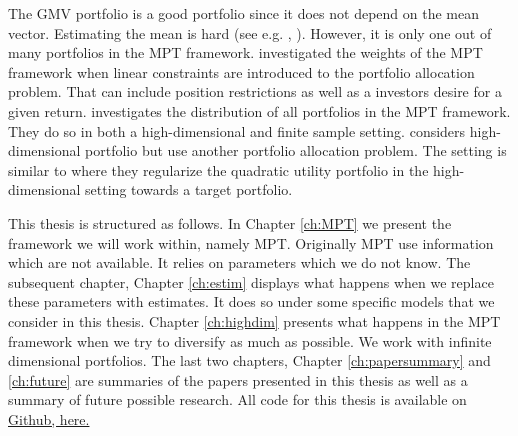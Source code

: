 The GMV portfolio is a good portfolio since it does not depend on the mean vector.
Estimating the mean is hard (see e.g. \citet{merton1980estimating}, \citet{best1991sensitivity}).
However, it is only one out of many portfolios in the MPT framework.
\citet{el2010high} investigated the weights of the MPT framework when linear constraints are introduced to the portfolio allocation problem.
That can include position restrictions as well as a investors desire for a given return.
\citet{bodnar2020sampling} investigates the distribution of all portfolios in the MPT framework.
They do so in both a high-dimensional and finite sample setting.
\citet{bodnarokhrinparolya2020} considers high-dimensional portfolio but use another portfolio allocation problem.
The setting is similar to \citet{bodnar2018estimation} where they regularize the quadratic utility portfolio in the high-dimensional setting towards a target portfolio.

This thesis is structured as follows. 
In Chapter \ref{ch:MPT} we present the framework we will work within, namely MPT. 
Originally MPT use information which are not available. 
It relies on parameters which we do not know. 
The subsequent chapter, Chapter \ref{ch:estim} displays what happens when we replace these parameters with estimates.
It does so under some specific models that we consider in this thesis.
Chapter \ref{ch:highdim} presents what happens in the MPT framework when we try to diversify as much as possible.
We work with infinite dimensional portfolios.
The last two chapters, Chapter \ref{ch:papersummary} and \ref{ch:future} are summaries of the papers presented in this thesis as well as a summary of future possible research.
All code for this thesis is available on \href{https://github.com/Ethorsn/Phd-thesis}{Github, here.}
